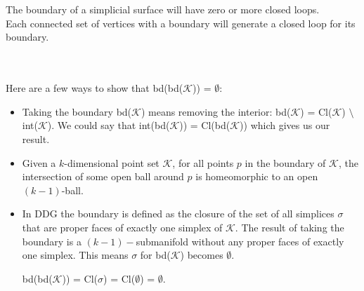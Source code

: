 \documentclass{article}
\begin{document}
\vspace{1.8cm}
\\\\

The boundary of a simplicial surface will have zero or more closed loops.\\
Each connected set of vertices with a boundary will generate a closed loop for its boundary.


\pagebreak
{}\\\\

Here are a few ways to show that bd(bd($\mathcal{K}$)) = $\emptyset$:

\begin{itemize}
    \item
    Taking the boundary bd($\mathcal{K}$) means removing the interior: bd($\mathcal{K}$) = Cl($\mathcal{K}$) $\setminus$ int($\mathcal{K}$).
    We could say that int(bd($\mathcal{K}$)) = Cl(bd($\mathcal{K}$)) which gives us our result.
    
    \item
    Given a $k$-dimensional point set $\mathcal{K}$, for all points $p$ in the boundary of $\mathcal{K}$, the intersection of some
    open ball around $p$ is homeomorphic to an open $(k-1)$-ball.
    
    \item
    In DDG the boundary is defined as the closure of the set of all simplices $\sigma$ that are proper faces of exactly one simplex of $\mathcal{K}$. 
    The result of taking the boundary is a $(k-1)-$submanifold without any proper faces of exactly one simplex.
    This means $\sigma$ for bd($\mathcal{K}$) becomes $\emptyset$.
    \begin{center}
        bd(bd($\mathcal{K}$)) = Cl($\sigma$) = Cl($\emptyset$) = $\emptyset$.
    \end{center}
\end{itemize}
\end{document}
